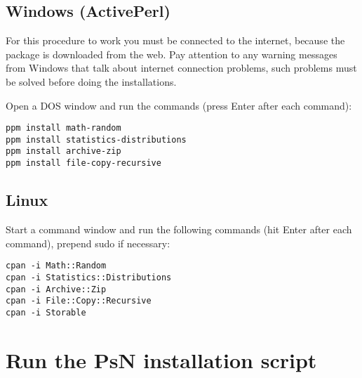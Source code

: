 \subsection{Windows (ActivePerl)}
For this procedure to work you must be connected to the internet, because the package is downloaded from the web. Pay attention to any warning messages from Windows that talk about internet connection problems, such problems must be solved before doing the installations.

Open a DOS window and run the commands (press Enter after each command):
\begin{verbatim}
ppm install math-random
ppm install statistics-distributions
ppm install archive-zip
ppm install file-copy-recursive
\end{verbatim}


\subsection{Linux}

Start a command window and run the following commands (hit Enter after each command), prepend sudo if necessary:
\begin{verbatim}
cpan -i Math::Random
cpan -i Statistics::Distributions
cpan -i Archive::Zip
cpan -i File::Copy::Recursive
cpan -i Storable
\end{verbatim}

\section{Run the PsN installation script}

